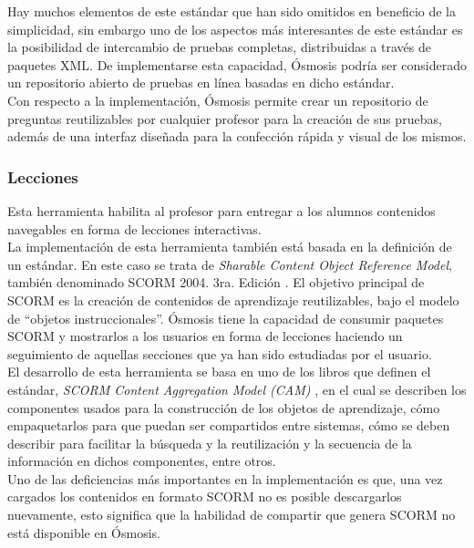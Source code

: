 Hay muchos elementos de este estándar que han sido omitidos en beneficio de la simplicidad, sin embargo uno de los aspectos más interesantes de este estándar es la posibilidad de intercambio de pruebas completas, distribuidas a través de paquetes XML. De implementarse esta capacidad, Ósmosis podría ser considerado un repositorio abierto de pruebas en línea basadas en dicho estándar.\\

Con respecto a la implementación, Ósmosis permite crear un repositorio de preguntas reutilizables por cualquier profesor para la creación de sus pruebas, además de una interfaz  diseñada para la confección rápida y visual de los mismos.

\subsubsection{Lecciones}
Esta herramienta habilita al profesor para entregar a los alumnos contenidos navegables en forma de lecciones interactivas.\\ 

La implementación de esta herramienta también está basada en la definición de un estándar. En este caso se trata de \emph{Sharable Content Object Reference Model}, también denominado SCORM 2004. 3ra. Edición \citep{IMP_ADL2008}. El objetivo principal de SCORM es la creación de contenidos de aprendizaje reutilizables, bajo el modelo de ``objetos instruccionales''. Ósmosis tiene la capacidad de consumir paquetes SCORM y mostrarlos a los usuarios en forma de lecciones haciendo un seguimiento de aquellas secciones que ya han sido estudiadas por el usuario.\\

El desarrollo de esta herramienta se basa en uno de los libros que definen el estándar, \emph{SCORM Content Aggregation Model (CAM)} \citep{SCORM_CAM}, en el cual se describen los componentes usados para la construcción de los objetos de aprendizaje, cómo empaquetarlos para que puedan ser compartidos entre sistemas, cómo se deben describir para facilitar la búsqueda y la reutilización y la secuencia de la información en dichos componentes, entre otros.\\

Uno de las deficiencias más importantes en la implementación es que, una vez cargados los contenidos en formato SCORM no es posible descargarlos nuevamente, esto significa que la habilidad de compartir que genera SCORM no está disponible en Ósmosis.

